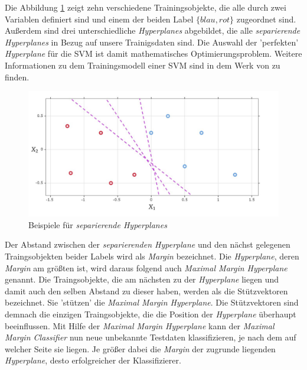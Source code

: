 Die Abbildung \ref{fig:separating_hyperplanes} zeigt zehn verschiedene Trainingsobjekte, die alle durch zwei Variablen definiert sind und
einem der beiden Label $\{blau, rot\}$ zugeordnet sind. Außerdem sind drei unterschiedliche \textit{Hyperplanes} abgebildet, die alle 
\textit{separierende Hyperplanes} in Bezug auf unsere Trainigsdaten sind. Die Auswahl der 'perfekten' \textit{Hyperplane} für die SVM ist
damit mathematisches Optimierungsproblem. 
Weitere Informationen zu dem Trainingsmodell einer SVM sind in dem Werk von \citeauthor{suthaharan_2015} zu finden.\cite[S. 210ff.]{suthaharan_2015}
\begin{figure}[H]
	\centering
	\includegraphics[width=\imgMed]{images/theory/separating_hyperplanes.jpg}
	\caption{Beispiele für \textit{separierende Hyperplanes}} 
	\label{fig:separating_hyperplanes}
\end{figure}
Der Abstand zwischen der \textit{separierenden Hyperplane} und den nächst gelegenen Traingsobjekten beider Labels
wird als \textit{Margin} bezeichnet. Die \textit{Hyperplane}, deren \textit{Margin} am größten ist,
wird daraus folgend auch \textit{Maximal Margin Hyperplane} genannt.
Die Traingsobjekte, die am nächsten zu der \textit{Hyperplane} liegen und damit auch den selben Abstand zu dieser haben,
werden als die Stützvektoren bezeichnet. Sie 'stützen' die \textit{Maximal Margin Hyperplane}.
Die Stützvektoren sind demnach die einzigen Traingsobjekte, die die Position der \textit{Hyperplane} überhaupt beeinflussen.\cite[S. 341]{james_2013}
Mit Hilfe der \textit{Maximal Margin Hyperplane} kann der 
\textit{Maximal Margin Classifier} nun neue unbekannte Testdaten klassifizieren, je nach dem auf welcher Seite sie liegen.
Je größer dabei die \textit{Margin} der zugrunde liegenden \textit{Hyperplane}, desto erfolgreicher der Klassifizierer.\cite[S. 1566]{noble_2006}


